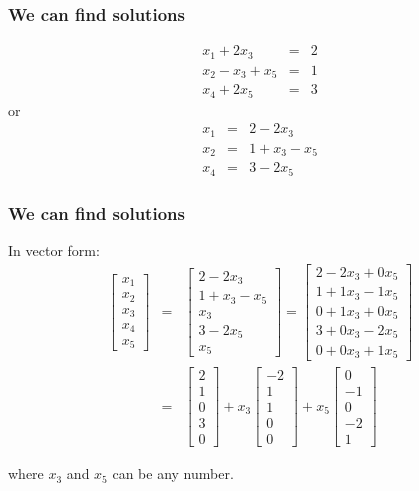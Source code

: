 \begin{frame}
  \frametitle{We can find solutions}
  

  \begin{eqnarray*}
    x_1 + 2x_3 & = & 2 \\
    x_2 - x_3 + x_5 & = & 1 \\
    x_4 + 2x_5 & = & 3 
  \end{eqnarray*}
  or
  \begin{eqnarray*}
    x_1  & = & 2 -  2x_3\\
    x_2  & = & 1 +  x_3 - x_5\\
    x_4  & = & 3 - 2x_5
  \end{eqnarray*}

\end{frame}

\begin{frame}
  \frametitle{We can find solutions}

  In vector form:
  \begin{eqnarray*}
    \left[ \begin{array}{r}x_1\\x_2\\x_3\\x_4\\x_5\end{array}\right] & = & 
    \left[ \begin{array}{r}2-2x_3\\1+x_3-x_5\\x_3\\3-2x_5\\x_5\end{array}\right]=
    \left[ \begin{array}{r}2-2x_3+0x_5\\1+1x_3-1x_5\\0+1x_3+0x_5\\3+0x_3-2x_5\\0+0x_3+1x_5\end{array}\right]    
    \\
    & = & 
    \left[ \begin{array}{r}2\\1\\0\\3\\0\end{array}\right] 
    + x_3 \left[ \begin{array}{r}-2\\1\\1\\0\\0\end{array}\right]
    + x_5 \left[ \begin{array}{r}0\\-1\\0\\-2\\1\end{array}\right]
  \end{eqnarray*}

  where $x_3$ and $x_5$ can be any number.

  
\end{frame}


